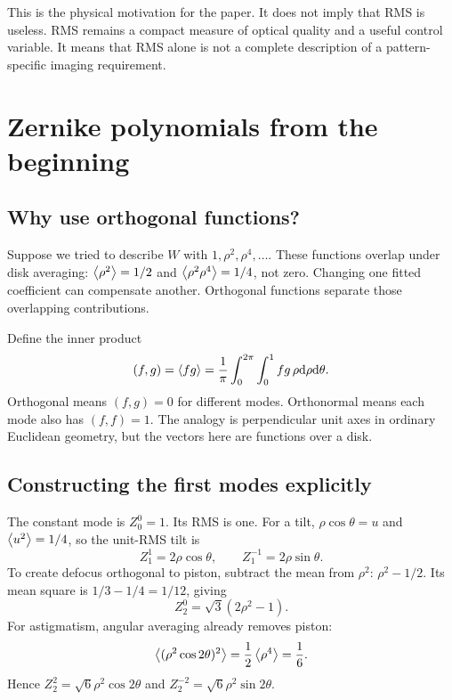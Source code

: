 This is the physical motivation for the paper. It does not imply that
RMS is useless. RMS remains a compact measure of optical quality and a
useful control variable. It means that RMS alone is not a complete
description of a pattern-specific imaging requirement.

\chapter{Zernike polynomials from the beginning}\label{ch:zernike}

\section{Why use orthogonal functions?}
Suppose we tried to describe $W$ with $1,\rho^2,\rho^4,\ldots$.
These functions overlap under disk averaging:
$\left\langle \rho^2\right\rangle=1/2$ and $\left\langle \rho^2\rho^4\right\rangle=1/4$, not zero.
Changing one fitted coefficient can compensate another.
Orthogonal functions separate those overlapping contributions.

Define the inner product
\[
(f,g)=\left\langle fg\right\rangle
=\frac1\pi\int_0^{2\pi}\int_0^1fg\,\rho\mathrm{d}\rho\mathrm{d}\theta.
\]
Orthogonal means $(f,g)=0$ for different modes.
Orthonormal means each mode also has $(f,f)=1$.
The analogy is perpendicular unit axes in ordinary Euclidean geometry,
but the vectors here are functions over a disk.

\section{Constructing the first modes explicitly}
The constant mode is $Z_0^0=1$. Its RMS is one.
For a tilt, $\rho\cos\theta=u$ and $\left\langle u^2\right\rangle=1/4$,
so the unit-RMS tilt is
\[
Z_1^1=2\rho\cos\theta,\qquad
Z_1^{-1}=2\rho\sin\theta.
\]
To create defocus orthogonal to piston, subtract the mean from $\rho^2$:
$\rho^2-1/2$. Its mean square is
$1/3-1/4=1/12$, giving
\begin{equation}
Z_2^0=\sqrt3(2\rho^2-1).
\end{equation}
For astigmatism, angular averaging already removes piston:
\[
\left\langle (\rho^2\cos2\theta)^2\right\rangle
=\frac12\left\langle \rho^4\right\rangle=\frac16.
\]
Hence
$Z_2^2=\sqrt6\rho^2\cos2\theta$ and
$Z_2^{-2}=\sqrt6\rho^2\sin2\theta$.

